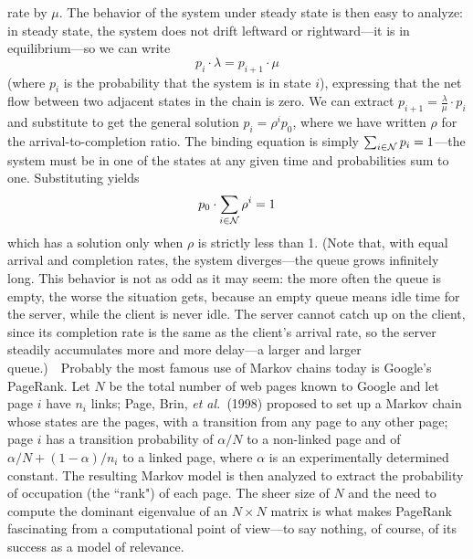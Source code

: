 \documentclass[11pt]{article}
\begin{document}
rate by $\mu$.
The behavior of the system under steady state is then easy to analyze:
in steady state, the system does not drift leftward or rightward---it is in
equilibrium---so we can write
  $$p_i\cdot\lambda = p_{i+1}\cdot\mu$$
(where $p_i$ is the probability that the system is in state $i$),
expressing that the net flow between two adjacent states in the chain is zero.
We can extract $p_{i+1} = \frac{\lambda}{\mu}\cdot p_i$ and substitute
to get the general solution $p_i = \rho^i p_0$, where we have written
$\rho$ for the arrival-to-completion ratio.  The binding equation is
simply $\sum_{i\in\cal{N}} p_i = 1$---the system must be in one of the states
at any given time and probabilities sum to one.  Substituting yields
  $$p_0\cdot \sum_{i\in\cal{N}} \rho^i = 1$$
which has a solution only when $\rho$ is strictly less than 1.
(Note that, with equal arrival and completion rates, the system diverges---the
queue grows infinitely long. This behavior is not as odd as it may seem:
the more often the queue is empty, the worse the situation gets,
because an empty queue means idle time for the server, while the client
is never idle.  The server cannot catch up on the client, since its completion
rate is the same as the client's arrival rate, so the server steadily
accumulates more and more delay---a larger and larger queue.)\ \ Probably the
most famous use of Markov chains today is Google's PageRank. Let $N$ be the
total number of web pages known to Google and let page $i$ have $n_i$ links;
Page, Brin, \emph{et al.}\ (1998) proposed to set up a Markov chain whose
states are the pages, with a transition from any page to any other page;
page $i$ has a transition probability of $\alpha/N$ to a non-linked page
and of $\alpha/N + (1-\alpha)/n_i$ to a linked page, where $\alpha$ is
an experimentally determined constant.  The resulting Markov model is then
analyzed to extract the probability of occupation (the ``rank") of each page.
The sheer size of $N$ and the need to compute the dominant eigenvalue of an
$N\times N$ matrix is what makes PageRank fascinating from a computational
point of view---to say nothing, of course, of its success as a model of
relevance.
\end{document}
